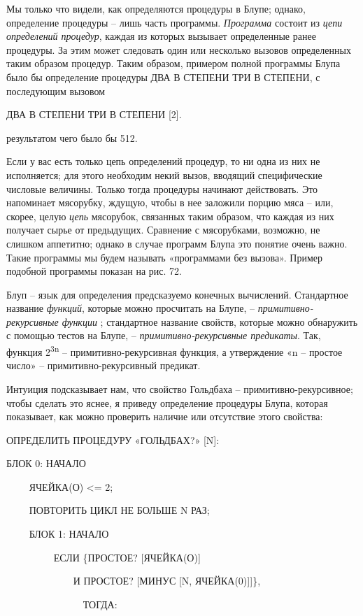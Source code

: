 \documentclass[../main.tex]{subfiles}
\begin{document}
Мы только что видели, как определяются процедуры в Блупе; однако, определение процедуры \--- лишь часть программы. \emph{Программа} состоит из \emph{цепи определений процедур}, каждая из которых вызывает определенные ранее процедуры. За этим может следовать один или несколько вызовов определенных таким образом процедур. Таким образом, примером полной программы Блупа было бы определение процедуры ДВА В СТЕПЕНИ ТРИ В СТЕПЕНИ, с последующим вызовом

ДВА В СТЕПЕНИ ТРИ В СТЕПЕНИ {[}2{]}.

результатом чего было бы 512.

Если у вас есть только цепь определений процедур, то ни одна из них не исполняется; для этого необходим некий вызов, вводящий специфические числовые величины. Только тогда процедуры начинают действовать. Это напоминает мясорубку, ждущую, чтобы в нее заложили порцию мяса \--- или, скорее, целую \emph{цепь} мясорубок, связанных таким образом, что каждая из них получает сырье от предыдущих. Сравнение с мясорубками, возможно, не слишком аппетитно; однако в случае программ Блупа это понятие очень важно. Такие программы мы будем называть «программами без вызова». Пример подобной программы показан на рис. 72.

Блуп \--- язык для определения предсказуемо конечных вычислений. Стандартное название \emph{функций}, которые можно просчитать на Блупе, \--- \emph{примитивно-рекурсивные функции} ; стандартное название свойств, которые можно обнаружить с помощью тестов на Блупе, \--- \emph{примитивно-рекурсивные предикаты}. Так, функция 2\textsuperscript{3n} \--- примитивно-рекурсивная функция, а утверждение «n \--- простое число» \--- примитивно-рекурсивный предикат.

Интуиция подсказывает нам, что свойство Гольдбаха \--- примитивно-рекурсивное; чтобы сделать это яснее, я приведу определение процедуры Блупа, которая показывает, как можно проверить наличие или отсутствие этого свойства:

ОПРЕДЕЛИТЬ ПРОЦЕДУРУ «ГОЛЬДБАХ?» {[}N{]}:

БЛОК 0: НАЧАЛО

~~~~ ЯЧЕЙКА(О) \textless= 2;

~~~~ ПОВТОРИТЬ ЦИКЛ НЕ БОЛЬШЕ N РАЗ;

~~~~ БЛОК 1: НАЧАЛО

~~~~~~~~~ ЕСЛИ \{ПРОСТОЕ? {[}ЯЧЕЙКА(О){]}

~~~~~~~~~~~~~ И ПРОСТОЕ? {[}МИНУС {[}N, ЯЧЕЙКА(0){]}{]}\},

~~~~~~~~~~~~~~~ ТОГДА:
\end{document}
